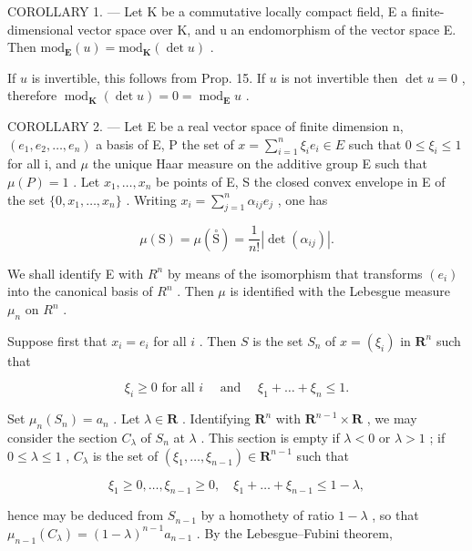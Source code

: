 COROLLARY 1. --- Let K be a commutative locally compact field, E a finite-dimensional vector space over K, and u an endomorphism of the vector space E. Then \(\text{mod}_{\mathbf{E}}(u) = \text{mod}_{\mathbf{K}}(\det u)\) .

If \(u\) is invertible, this follows from Prop. 15. If \(u\) is not invertible then \(\det u = 0\) , therefore \(\operatorname{mod}_{\mathbf{K}}(\det u) = 0 = \operatorname{mod}_{\mathbf{E}}u\) .

COROLLARY 2. --- Let E be a real vector space of finite dimension n, \((e_{1}, e_{2}, \ldots, e_{n})\) a basis of E, P the set of \(x = \sum_{i=1}^{n} \xi_{i} e_{i} \in E\) such that \(0 \leqslant \xi_{i} \leqslant 1\) for all i, and \(\mu\) the unique Haar measure on the additive group E such that \(\mu(P) = 1\) . Let \(x_{1}, \ldots, x_{n}\) be points of E, S the closed convex envelope in E of the set \(\{0, x_{1}, \ldots, x_{n}\}\) . Writing \(x_{i} = \sum_{j=1}^{n} \alpha_{ij} e_{j}\) , one has

\[
\mu (\mathrm{S}) = \mu (\stackrel {\circ} {\mathrm{S}}) = \frac {1}{n !} | \det (\alpha_ {i j}) |.
\]

We shall identify E with \(R^{n}\) by means of the isomorphism that transforms \((e_{i})\) into the canonical basis of \(R^{n}\) . Then \(\mu\) is identified with the Lebesgue measure \(\mu_{n}\) on \(R^{n}\) .

Suppose first that \(x_{i} = e_{i}\) for all \(i\) . Then \(S\) is the set \(S_{n}\) of \(x = (\xi_{i})\) in \(\mathbf{R}^n\) such that

\[
\xi_ {i} \geqslant 0 \text {   for   all   } i \quad \text { and } \quad \xi_ {1} + \dots + \xi_ {n} \leqslant 1.
\]

Set \(\mu_n(S_n) = a_n\) . Let \(\lambda \in \mathbf{R}\) . Identifying \(\mathbf{R}^n\) with \(\mathbf{R}^{n-1} \times \mathbf{R}\) , we may consider the section \(C_\lambda\) of \(S_n\) at \(\lambda\) . This section is empty if \(\lambda < 0\) or \(\lambda > 1\) ; if \(0 \leqslant \lambda \leqslant 1\) , \(C_\lambda\) is the set of \((\xi_1, \ldots, \xi_{n-1}) \in \mathbf{R}^{n-1}\) such that

\[
\xi_ {1} \geqslant 0, \dots , \xi_ {n - 1} \geqslant 0, \quad \xi_ {1} + \dots + \xi_ {n - 1} \leqslant 1 - \lambda ,
\]

hence may be deduced from \(S_{n-1}\) by a homothety of ratio \(1-\lambda\) , so that \(\mu_{n-1}(C_{\lambda})=(1-\lambda)^{n-1}a_{n-1}\) . By the Lebesgue--Fubini theorem,

